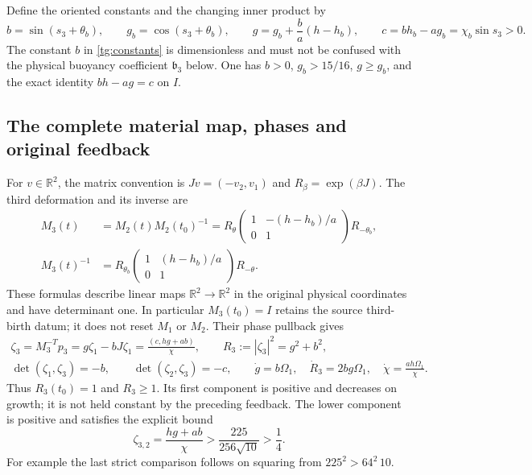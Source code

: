 Define the oriented constants and the changing inner product by
\begin{equation}\label{tg:constants}
 b=\sin(s_3+\theta_b),\qquad g_b=\cos(s_3+\theta_b),\qquad
 g=g_b+\frac ba(h-h_b),\qquad
 c=bh_b-ag_b=\chi_b\sin s_3>0.
\end{equation}
The constant $b$ in \eqref{tg:constants} is dimensionless and must not
be confused with the physical buoyancy coefficient $\mathfrak b_3$
below. One has $b>0$, $g_b>15/16$, $g\geq g_b$, and the exact identity
$bh-ag=c$ on $I$.

\subsection{The complete material map, phases and original feedback}

For $v\in\mathbb R^2$, the matrix convention is
$Jv=(-v_2,v_1)$ and $R_\beta=\exp(\beta J)$.
The third deformation and its inverse are
\begin{equation}\label{tg:material}
\begin{aligned}
 M_3(t)&=M_2(t)M_2(t_0)^{-1}
 =R_\theta
   \begin{pmatrix}1&-(h-h_b)/a\\0&1\end{pmatrix}R_{-\theta_b},\\
 M_3(t)^{-1}&=R_{\theta_b}
   \begin{pmatrix}1&(h-h_b)/a\\0&1\end{pmatrix}R_{-\theta}.
\end{aligned}
\end{equation}
These formulas describe linear maps $\mathbb R^2\to\mathbb R^2$
in the original physical coordinates and have determinant one.
In particular $M_3(t_0)=I$ retains the source third-birth datum;
it does not reset $M_1$ or $M_2$.
Their phase pullback gives
\begin{equation}\label{tg:phase}
 \begin{gathered}
 \zeta_3=M_3^{-T}p_3=g\zeta_1-bJ\zeta_1
      =\frac{(c,hg+ab)}\chi,\qquad
 R_3:=|\zeta_3|^2=g^2+b^2,\\
 \det(\zeta_1,\zeta_3)=-b,\qquad
 \det(\zeta_2,\zeta_3)=-c,\qquad
 \dot g=b\Omega_1,\quad \dot R_3=2bg\Omega_1,
 \quad\dot\chi=\frac{ah\Omega_1}{\chi}.
 \end{gathered}
\end{equation}
Thus $R_3(t_0)=1$ and $R_3\geq1$. Its first component is positive
and decreases on growth; it is not held constant by the preceding
feedback. The lower component is positive and satisfies the explicit
bound
\begin{equation}\label{tg:domain}
 \zeta_{3,2}=\frac{hg+ab}{\chi}
       >\frac{225}{256\sqrt{10}}>\frac14.
\end{equation}
For example the last strict comparison follows on squaring from
$225^2>64^2\,10$.

